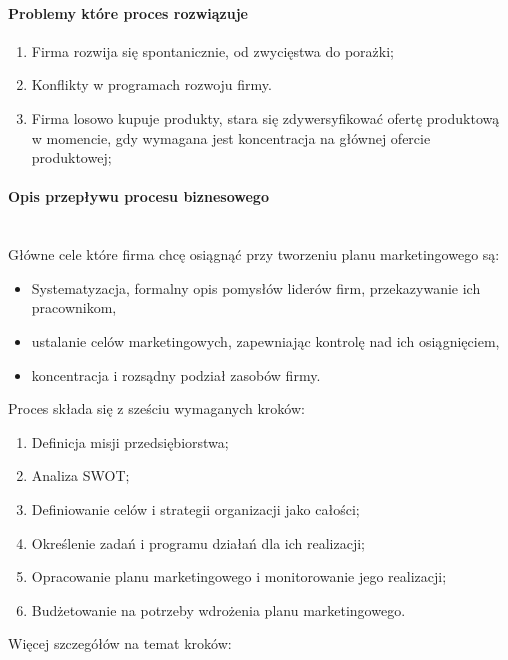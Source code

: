 \documentclass[a4paper, 12pt]{article}
\begin{document}
\paragraph{Problemy które proces rozwiązuje}
\begin{enumerate}
	\item Firma rozwija się spontanicznie, od zwycięstwa do porażki;
	\item Konflikty w programach rozwoju firmy. 
	\item Firma losowo kupuje produkty, stara się zdywersyfikować ofertę produktową w momencie, gdy wymagana jest koncentracja na głównej ofercie produktowej;
\end{enumerate} 
\paragraph{Opis przepływu procesu biznesowego}\mbox{}\\
\hspace*{1 cm} Główne cele które firma chcę osiągnąć przy tworzeniu planu marketingowego są:
\begin{itemize}
	\item Systematyzacja, formalny opis pomysłów liderów firm, przekazywanie ich pracownikom,
	\item ustalanie celów marketingowych, zapewniając kontrolę nad ich osiągnięciem,
	\item koncentracja i rozsądny podział zasobów firmy.
\end{itemize} 
\hspace*{1 cm} Proces składa się z sześciu wymaganych kroków:
\begin{enumerate}
	\item Definicja misji przedsiębiorstwa;
	\item Analiza SWOT;
	\item Definiowanie celów i strategii organizacji jako całości;
	\item Określenie zadań i programu działań dla ich realizacji;
	\item Opracowanie planu marketingowego i monitorowanie jego realizacji;
	\item Budżetowanie na potrzeby wdrożenia planu marketingowego.
\end{enumerate}
\newpage
Więcej szczegółów na temat kroków:
\end{document}
